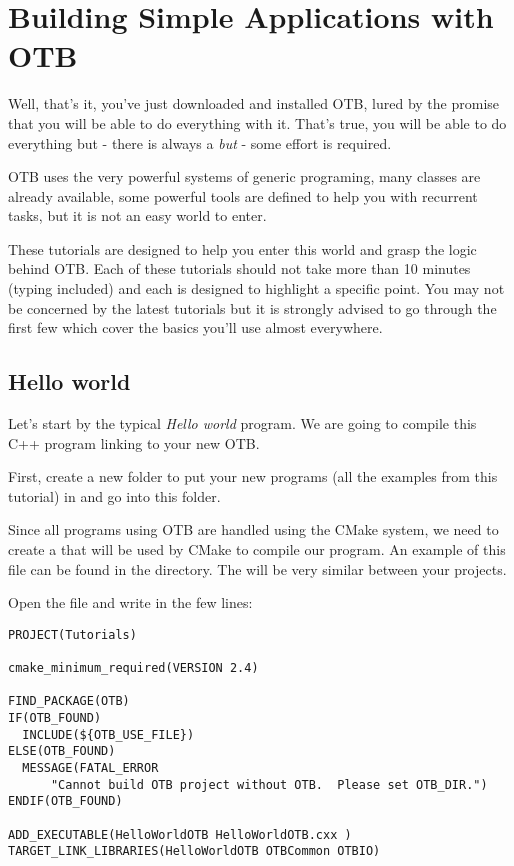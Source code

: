 \chapter{Building Simple Applications with OTB}

Well, that's it, you've just downloaded and installed OTB, lured by the promise
that you will be able to do everything with it. That's true, you will be able
to do everything but - there is always a {\em but} - some effort is required.

OTB uses the very powerful systems of generic programing, many classes are
already available, some powerful tools are defined to help you with recurrent
tasks, but it is not an easy world to enter.

These tutorials are designed to help you enter this world and grasp the logic
behind OTB. Each of these tutorials should not take more than 10 minutes (typing
included) and each is designed to highlight a specific point. You may not be
concerned by the latest tutorials but it is strongly advised to go through the
first few which cover the basics you'll use almost everywhere.


\section{Hello world}
\label{sec:TutorialHelloWorld}


Let's start by the typical {\em Hello world} program. We are going to compile
this C++ program linking to your new OTB.

First, create a new folder to put your new programs (all the examples from this
tutorial) in and go into this folder.

Since all programs using OTB are handled using the CMake system, we need to create a
 that will be used by CMake to compile our program. An
example of this file can be found in the 
directory. The  will be very similar between your projects.

Open the  file and write in the few lines:


\begin{small}
\begin{verbatim}
PROJECT(Tutorials)

cmake_minimum_required(VERSION 2.4)

FIND_PACKAGE(OTB)
IF(OTB_FOUND)
  INCLUDE(${OTB_USE_FILE})
ELSE(OTB_FOUND)
  MESSAGE(FATAL_ERROR
      "Cannot build OTB project without OTB.  Please set OTB_DIR.")
ENDIF(OTB_FOUND)

ADD_EXECUTABLE(HelloWorldOTB HelloWorldOTB.cxx )
TARGET_LINK_LIBRARIES(HelloWorldOTB OTBCommon OTBIO)
\end{verbatim}
\end{small}


